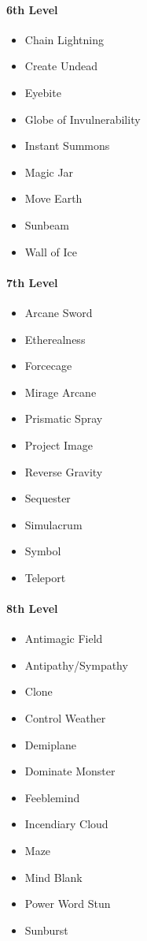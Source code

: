 \paragraph{6th Level}\label{_6th_level}

\begin{itemize}
\item
  Chain Lightning
\item
  Create Undead
\item
  Eyebite
\item
  Globe of Invulnerability
\item
  Instant Summons
\item
  Magic Jar
\item
  Move Earth
\item
  Sunbeam
\item
  Wall of Ice
\end{itemize}

\paragraph{7th Level}\label{_7th_level}

\begin{itemize}
\item
  Arcane Sword
\item
  Etherealness
\item
  Forcecage
\item
  Mirage Arcane
\item
  Prismatic Spray
\item
  Project Image
\item
  Reverse Gravity
\item
  Sequester
\item
  Simulacrum
\item
  Symbol
\item
  Teleport
\end{itemize}

\paragraph{8th Level}\label{_8th_level}

\begin{itemize}
\item
  Antimagic Field
\item
  Antipathy/Sympathy
\item
  Clone
\item
  Control Weather
\item
  Demiplane
\item
  Dominate Monster
\item
  Feeblemind
\item
  Incendiary Cloud
\item
  Maze
\item
  Mind Blank
\item
  Power Word Stun
\item
  Sunburst
\end{itemize}

